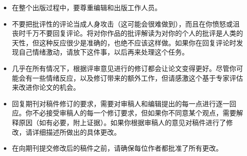 \begin{itemize}
\item 在整个出版过程中，要尊重编辑和出版工作人员。
\item 不要把批评性的评论当成人身攻击（这可能会很难做到），而且在你愤怒或沮丧时千万不要回复评论。将对你作品的批评解读为对你的个人的批评是人类的天性，但这种反应很少是准确的，也绝不应该这样做。如果你在回复评论时发现自己情绪激动，请放下这件事，以后再来处理这个任务。
\item 几乎在所有情况下，根据评审意见进行的修订都会让论文变得更好。尽管你可能会有一些情绪反应，以及修订带来的额外工作，但请感激这个基于专家评估来改进你论文的机会。
\item 回复期刊对稿件修订的要求，需要对审稿人和编辑提出的每一点进行逐一回应。你不必接受审稿人的每一个修订要求，但如果你不同意某个观点，需要解释原因（如有必要，附上证据）。如果你根据审稿人的意见对稿件进行了修改，请详细描述所做出的具体更改。
\item 在向期刊提交修改后的稿件之前，请确保每位作者都批准了所有更改。

\end{itemize}
